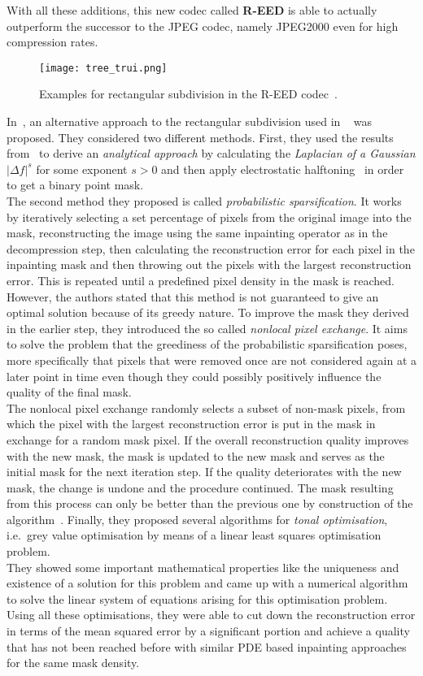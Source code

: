 With all these additions, this new codec called \textbf{R-EED} is able to actually outperform the
successor to the JPEG codec, namely JPEG2000 even for high compression rates.
\begin{figure}[H]
    \centering
    \texttt{[image: tree\_trui.png]}
    \caption{Examples for rectangular subdivision in the R-EED codec~\cite{schmaltz09}.}
\end{figure}
\noindent In~\cite{hoeltgen12}, an alternative approach to the rectangular subdivision used in
~\cite{schmaltz09} was proposed. They considered two different methods. First, they used the results
from~\cite{belhachmi09} to derive an \textit{analytical approach} by calculating the \textit{Laplacian of a
Gaussian} $\vert \Delta f \vert^s$ for some exponent $s>0$ and then apply electrostatic 
halftoning~\cite{electrostatic} in order to get a binary point mask.\\
The second method they proposed is called \textit{probabilistic sparsification}. It works by
iteratively selecting a set percentage of pixels from the original image into the mask,
reconstructing the image using the same inpainting operator as in the decompression step, then
calculating the reconstruction error for each pixel in the inpainting mask and then throwing out
the pixels with the largest reconstruction error. This is repeated until a predefined pixel
density in the mask is reached. However, the authors stated that this method is not guaranteed to
give an optimal solution because of its greedy nature. To improve the mask they derived in the
earlier step, they introduced the so called \textit{nonlocal pixel exchange}. It aims to solve the
problem that the greediness of the probabilistic sparsification poses, more specifically that
pixels that were removed once are not considered again at a later point in time even though they
could possibly positively influence the quality of the final mask.\\
The nonlocal pixel exchange randomly selects a subset of non-mask pixels, from which the pixel with
the largest reconstruction error is put in the mask in exchange for a random mask pixel.
If the overall reconstruction quality improves with the new mask, the mask is updated to the new
mask and serves as the initial mask for the next iteration step. If the quality deteriorates with
the new mask, the change is undone and the procedure continued.
The mask resulting from this process can only be better than the previous one by construction of
the algorithm~\cite{hoeltgen12}.
Finally, they proposed several algorithms for \textit{tonal optimisation}, i.e.\ grey value
optimisation by means of a linear least squares optimisation problem. \\
They showed some important mathematical properties like the uniqueness and existence of a 
solution for this problem and came up with a numerical algorithm to solve the linear system of 
equations arising for this optimisation problem.
Using all these optimisations, they were able to cut down the reconstruction error in terms of the
mean squared error by a significant portion and achieve a quality that has not been reached before 
with similar PDE based inpainting approaches for the same mask density.

